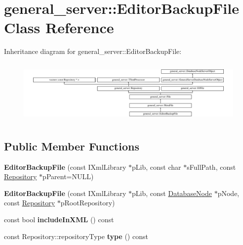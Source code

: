 \hypertarget{classgeneral__server_1_1EditorBackupFile}{\section{general\-\_\-server\-:\-:\-Editor\-Backup\-File \-Class \-Reference}
\label{classgeneral__server_1_1EditorBackupFile}
}
\-Inheritance diagram for general\-\_\-server\-:\-:\-Editor\-Backup\-File\-:\begin{figure}[H]
\begin{center}
\leavevmode
\includegraphics[height=3.146067cm]{classgeneral__server_1_1EditorBackupFile}
\end{center}
\end{figure}
\subsection*{\-Public \-Member \-Functions}
\begin{DoxyCompactItemize}
\item 
\hypertarget{classgeneral__server_1_1EditorBackupFile_a175b1a9b113a27e13907fd14f8ca692e}{{\bfseries \-Editor\-Backup\-File} (const \-I\-Xml\-Library $\ast$p\-Lib, const char $\ast$s\-Full\-Path, const \hyperlink{classgeneral__server_1_1Repository}{\-Repository} $\ast$p\-Parent=\-N\-U\-L\-L)}\label{classgeneral__server_1_1EditorBackupFile_a175b1a9b113a27e13907fd14f8ca692e}

\item 
\hypertarget{classgeneral__server_1_1EditorBackupFile_a86f6d5052be1ba08adc7cbc7661bc393}{{\bfseries \-Editor\-Backup\-File} (const \-I\-Xml\-Library $\ast$p\-Lib, const \hyperlink{classgeneral__server_1_1DatabaseNode}{\-Database\-Node} $\ast$p\-Node, const \hyperlink{classgeneral__server_1_1Repository}{\-Repository} $\ast$p\-Root\-Repository)}\label{classgeneral__server_1_1EditorBackupFile_a86f6d5052be1ba08adc7cbc7661bc393}

\item 
\hypertarget{classgeneral__server_1_1EditorBackupFile_a00e573589b78616d3bd8c7f70efd0b97}{const bool {\bfseries include\-In\-X\-M\-L} () const }\label{classgeneral__server_1_1EditorBackupFile_a00e573589b78616d3bd8c7f70efd0b97}

\item 
\hypertarget{classgeneral__server_1_1EditorBackupFile_a606c2bb0c056039a89a87e3bcd5ee065}{const \-Repository\-::repository\-Type {\bfseries type} () const }\label{classgeneral__server_1_1EditorBackupFile_a606c2bb0c056039a89a87e3bcd5ee065}

\end{DoxyCompactItemize}
